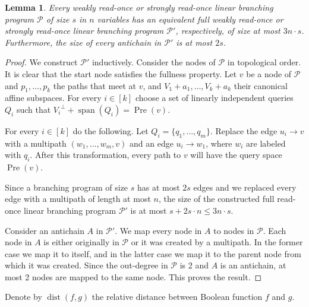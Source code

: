 \documentclass[10pt,a4paper]{article}
\newtheorem{lemma}[theorem]{Lemma}
\theoremstyle{definition}
\theoremstyle{remark}
\DeclareMathOperator{\dist}{dist}
\DeclareMathOperator{\Span}{span}
\DeclareMathOperator{\pre}{Pre}
\newcommand{\orth}[1]{{#1}^{\perp}}
\newcommand{\calP}{\mathcal{P}}
\newcommand{\sreadonce}{strongly read-once}
\newcommand{\wreadonce}{weakly read-once}
\newcommand{\readonce}{read-once}
\begin{document}
\begin{lemma}\label{lem:full_bp}
  Every \wreadonce{} or \sreadonce{} linear branching program $\calP$ of size $s$ in $n$ variables has an equivalent full \wreadonce{} or \sreadonce{} linear branching program $\calP'$, respectively, of size at most $3n \cdot s$. Furthermore, the size of every antichain in $\calP'$ is at most $2s$.
\end{lemma}
\begin{proof}
  We construct $\calP'$ inductively. Consider the nodes of $\calP$ in topological order. It is clear that the start node satisfies the fullness property. Let $v$ be a node of $\calP$ and $p_1, \ldots, p_k$ the paths that meet at $v$, and $V_1 + a_1, \ldots, V_k + a_k$ their canonical affine subspaces. 
  For every $i \in [k]$ choose a set of linearly independent queries $Q_i$ such that $\orth{V_i} + \Span(Q_i) = \pre(v)$.

  For every $i \in [k]$ do the following. Let $Q_i = \{q_1, \ldots, q_m\}$. Replace the edge $u_i \to v$ with a multipath $(w_1, \ldots, w_m, v)$ and an edge $u_i \to w_1$, where $w_i$ are labeled with $q_i$. After this transformation, every path to $v$ will have the query space $\pre(v)$.

  Since a branching program of size $s$ has at most $2s$ edges and we replaced every edge with a multipath of length at most $n$, the size of the constructed full \readonce{} linear branching program $\calP'$ is at most $s+2s \cdot n \le 3n \cdot s$.

  Consider an antichain $A$ in $\calP'$. We map every node in $A$ to nodes in $\calP$. Each node in $A$ is either originally in $\calP$ or it was created by a multipath. In the former case we map it to itself, and in the latter case we map it to the parent node from which it was created. Since the out-degree in $\calP$ is 2 and $A$ is an antichain, at most 2 nodes are mapped to the same node. This proves the result.
\end{proof}

Denote by $\dist(f,g)$ the relative distance between Boolean function $f$ and $g$.
\end{document}
